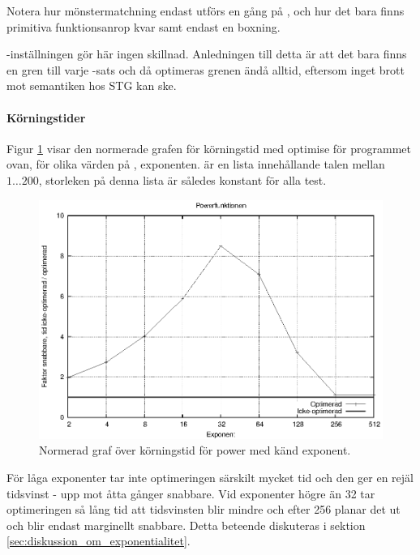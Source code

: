 \documentclass[Rapport]{subfiles}
\begin{document}
Notera hur mönstermatchning endast utförs en gång på , och hur det bara
finns primitiva funktionsanrop kvar samt endast en boxning. 

-inställningen gör här ingen skillnad. 
Anledningen till detta är att det bara finns en gren till varje -sats
och då optimeras grenen ändå alltid, 
eftersom inget brott mot semantiken hos STG kan ske.

\paragraph{Körningstider}

Figur \ref{fig:Resultat:power:graf} visar den normerade grafen för körningstid
med optimise för programmet ovan, för olika värden på , exponenten. 
 är en lista innehållande talen mellan $1 \ldots 200$, storleken på
denna lista är således konstant för alla test.

\begin{figure}[H]
\includegraphics{powernorm.eps}
\caption{Normerad graf över körningstid för power med känd exponent.}
\label{fig:Resultat:power:graf}
\end{figure}

För låga exponenter tar inte optimeringen särskilt mycket tid och
den ger en rejäl tidsvinst - upp mot åtta gånger snabbare.
Vid exponenter högre än 32 tar optimeringen så lång tid att tidsvinsten
blir mindre och efter 256 planar det ut och blir endast marginellt snabbare.
Detta beteende diskuteras i sektion \ref{sec:diskussion_om_exponentialitet}.
\end{document}
